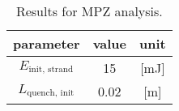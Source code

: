 \begin{table}[H]
    \caption{Results for MPZ analysis.} 
    \vspace{-1.em} 
    \fontsize{10}{10}
    \selectfont 
    \renewcommand{\arraystretch}{1.5}
    \begin{center}
        \begin{tabular}{ ccc }  
        \hline
        parameter & value & unit \\
        \hline
        $E_\text{init, strand}$ & 15 & [mJ] \\
        $L_\text{quench, init}$ & 0.02 & [m] \\
        \hline 
        \end{tabular}
    \end{center}  
     \label{table: mpz_analysis_results} 
 \end{table}